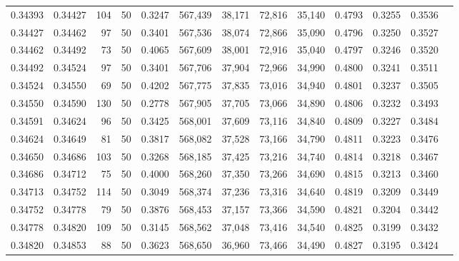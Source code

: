 \begin{tabular}{rrrrrrrrrrrrr}
0.34393 & 0.34427 &   104 &  50 &                                     0.3247 & 567,439 &  38,171 &  72,816 &  35,140 & 0.4793 & 0.3255 & 0.3536 \\
0.34427 & 0.34462 &    97 &  50 &                                     0.3401 & 567,536 &  38,074 &  72,866 &  35,090 & 0.4796 & 0.3250 & 0.3527 \\
0.34462 & 0.34492 &    73 &  50 &                                     0.4065 & 567,609 &  38,001 &  72,916 &  35,040 & 0.4797 & 0.3246 & 0.3520 \\
0.34492 & 0.34524 &    97 &  50 &                                     0.3401 & 567,706 &  37,904 &  72,966 &  34,990 & 0.4800 & 0.3241 & 0.3511 \\
0.34524 & 0.34550 &    69 &  50 &                                     0.4202 & 567,775 &  37,835 &  73,016 &  34,940 & 0.4801 & 0.3237 & 0.3505 \\
0.34550 & 0.34590 &   130 &  50 &                                     0.2778 & 567,905 &  37,705 &  73,066 &  34,890 & 0.4806 & 0.3232 & 0.3493 \\
0.34591 & 0.34624 &    96 &  50 &                                     0.3425 & 568,001 &  37,609 &  73,116 &  34,840 & 0.4809 & 0.3227 & 0.3484 \\
0.34624 & 0.34649 &    81 &  50 &                                     0.3817 & 568,082 &  37,528 &  73,166 &  34,790 & 0.4811 & 0.3223 & 0.3476 \\
0.34650 & 0.34686 &   103 &  50 &                                     0.3268 & 568,185 &  37,425 &  73,216 &  34,740 & 0.4814 & 0.3218 & 0.3467 \\
0.34686 & 0.34712 &    75 &  50 &                                     0.4000 & 568,260 &  37,350 &  73,266 &  34,690 & 0.4815 & 0.3213 & 0.3460 \\
0.34713 & 0.34752 &   114 &  50 &                                     0.3049 & 568,374 &  37,236 &  73,316 &  34,640 & 0.4819 & 0.3209 & 0.3449 \\
0.34752 & 0.34778 &    79 &  50 &                                     0.3876 & 568,453 &  37,157 &  73,366 &  34,590 & 0.4821 & 0.3204 & 0.3442 \\
0.34778 & 0.34820 &   109 &  50 &                                     0.3145 & 568,562 &  37,048 &  73,416 &  34,540 & 0.4825 & 0.3199 & 0.3432 \\
0.34820 & 0.34853 &    88 &  50 &                                     0.3623 & 568,650 &  36,960 &  73,466 &  34,490 & 0.4827 & 0.3195 & 0.3424 \\

\end{tabular}
